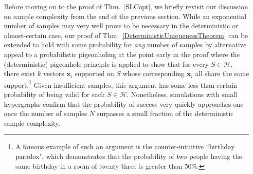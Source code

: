 \documentclass[journal, twocolumn]{IEEEtran}
\begin{document}
Before moving on to the proof of Thm.~\ref{SLCopt}, we briefly revisit our discussion on sample complexity from the end of the previous section. While an exponential number of samples may very well prove to be necessary in the deterministic or almost-certain case, our proof of Thm.~\ref{DeterministicUniquenessTheorem} can be extended to hold with some probability for \emph{any} number of samples by alternative appeal to a probabilistic pigeonholing at the point early in the proof where the (deterministic) pigeonhole principle is applied to show that for every $S \in \mathcal{H}$, there exist $k$ vectors $\mathbf{x}_i$ supported on $S$ whose corresponding $\mathbf{\overline x}_i$ all share the same support.\footnote{A famous example of such an argument is the counter-intuitive ``birthday paradox", which demonstrates that the probability of two people having the same birthday in a room of twenty-three is greater than 50\%.} 
Given insufficient samples, this argument has some less-than-certain probability of being valid for each $S \in \mathcal{H}$. Nonetheless, simulations with small hypergraphs confirm that the probability of success very quickly approaches one once the number of samples $N$ surpasses a small fraction of the deterministic sample complexity. 
\end{document}
